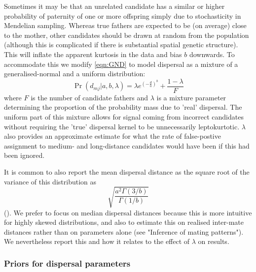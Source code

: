 \documentclass[10pt, a4paper, twocolumn]{article} %
\begin{document}
Sometimes it may be that an unrelated candidate has a similar or higher probability of paternity of one or more offspring simply due to stochasticity in Mendelian sampling.
Whereas true fathers are expected to be (on average) close to the mother, other candidates should be drawn at random from the population (although this is complicated if there is substantial spatial genetic structure).
This will inflate the apparent kurtosis in the data and bias $b$ downwards.
To accommodate this we modify \ref{eqn:GND} to model dispersal as a mixture of a generalised-normal and a uniform distribution:
\begin{equation}\label{eqn:mixture_model}
\Pr(d_{mj} | a,b,\lambda) = \lambda e^{  (-\frac{d}{a} )^b } + \frac{1-\lambda}{F}
\end{equation}
where $F$ is the number of candidate fathers and $\lambda$ is a mixture parameter determining the proportion of the probability mass due to ’real’ dispersal.
The uniform part of this mixture allows for signal coming from incorrect candidates without requiring the 'true' dispersal kernel to be unnecessarily leptokurtotic.
$\lambda$ also provides an approximate estimate for what the rate of false-postive assignment to medium- and long-distance candidates would have been if this had been ignored.

It is common to also report the mean dispersal distance as the square root of the variance of this distribution as
\begin{equation}
\label{eqn:sd_GND}    
\sqrt{ \frac{ a^2 \Gamma(3/b) }{ \Gamma(1/b) } }
\end{equation}
(\cite{Nadarajah2005}).
We prefer to focus on median dispersal distances because this is more intuitive for highly skewed distributions, and also to estimate this on realised inter-mate distances rather than on parameters alone (see "Inference of mating patterns"). We nevertheless report this and how it relates to the effect of $\lambda$ on results.

\subsubsection{Priors for dispersal parameters}
\end{document}
